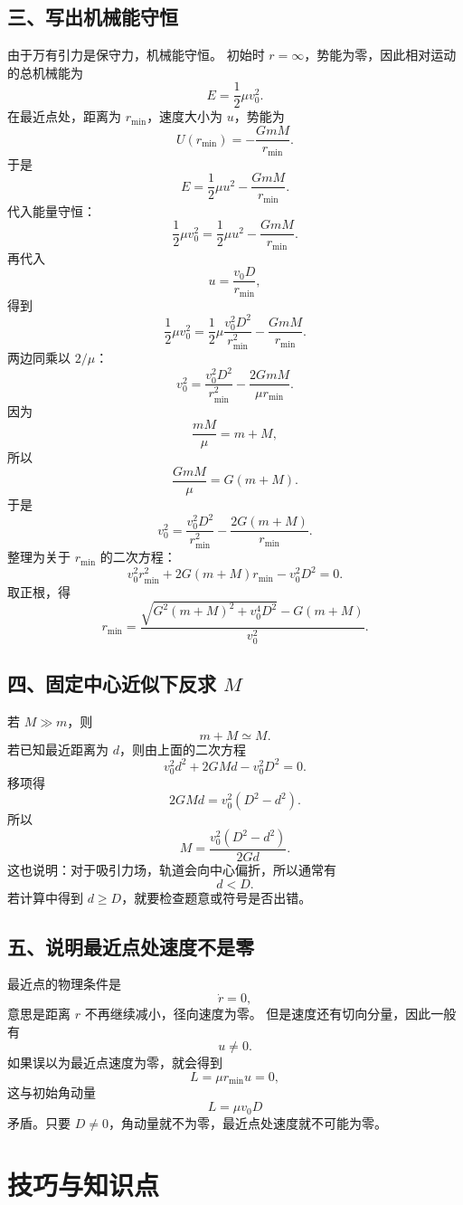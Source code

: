 \documentclass[11pt,a4paper]{ctexart}
\begin{document}
\subsection*{三、写出机械能守恒}
由于万有引力是保守力，机械能守恒。
初始时 $r=\infty$，势能为零，因此相对运动的总机械能为
\[
E=\frac{1}{2}\mu v_0^2.
\]
在最近点处，距离为 $r_{\min}$，速度大小为 $u$，势能为
\[
U(r_{\min})=-\frac{GmM}{r_{\min}}.
\]
于是
\[
E=\frac{1}{2}\mu u^2-\frac{GmM}{r_{\min}}.
\]
代入能量守恒：
\[
\frac{1}{2}\mu v_0^2
=
\frac{1}{2}\mu u^2-\frac{GmM}{r_{\min}}.
\]
再代入
\[
u=\frac{v_0D}{r_{\min}},
\]
得到
\[
\frac{1}{2}\mu v_0^2
=
\frac{1}{2}\mu \frac{v_0^2D^2}{r_{\min}^2}
-\frac{GmM}{r_{\min}}.
\]
两边同乘以 $2/\mu$：
\[
v_0^2
=
\frac{v_0^2D^2}{r_{\min}^2}
-\frac{2GmM}{\mu r_{\min}}.
\]
因为
\[
\frac{mM}{\mu}=m+M,
\]
所以
\[
\frac{GmM}{\mu}=G(m+M).
\]
于是
\[
v_0^2
=
\frac{v_0^2D^2}{r_{\min}^2}
-\frac{2G(m+M)}{r_{\min}}.
\]
整理为关于 $r_{\min}$ 的二次方程：
\[
v_0^2 r_{\min}^2
+2G(m+M)r_{\min}
-v_0^2D^2=0.
\]
取正根，得
\[
\boxed{
r_{\min}
=
\frac{
\sqrt{G^2(m+M)^2+v_0^4D^2}
-G(m+M)
}{v_0^2}
}.
\]

\subsection*{四、固定中心近似下反求 $M$}
若 $M\gg m$，则
\[
m+M\simeq M.
\]
若已知最近距离为 $d$，则由上面的二次方程
\[
v_0^2d^2+2GMd-v_0^2D^2=0.
\]
移项得
\[
2GMd=v_0^2(D^2-d^2).
\]
所以
\[
\boxed{
M=\frac{v_0^2(D^2-d^2)}{2Gd}
}.
\]
这也说明：对于吸引力场，轨道会向中心偏折，所以通常有
\[
d<D.
\]
若计算中得到 $d\geq D$，就要检查题意或符号是否出错。

\subsection*{五、说明最近点处速度不是零}
最近点的物理条件是
\[
\dot r=0,
\]
意思是距离 $r$ 不再继续减小，径向速度为零。
但是速度还有切向分量，因此一般有
\[
u\neq 0.
\]
如果误以为最近点速度为零，就会得到
\[
L=\mu r_{\min}u=0,
\]
这与初始角动量
\[
L=\mu v_0D
\]
矛盾。只要 $D\neq 0$，角动量就不为零，最近点处速度就不可能为零。

\section*{技巧与知识点}
\end{document}
